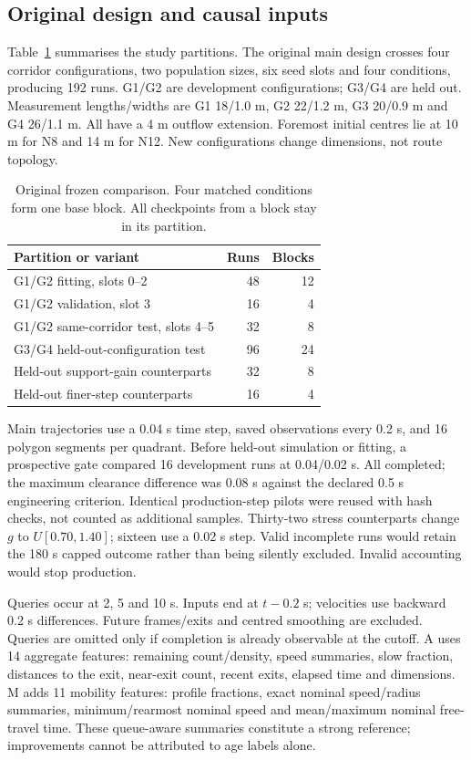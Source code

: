 \subsection{Original design and causal inputs}
Table~\ref{tab:design} summarises the study partitions. The original main design crosses four corridor configurations, two population sizes, six seed slots and four conditions, producing 192 runs. G1/G2 are development configurations; G3/G4 are held out. Measurement lengths/widths are G1 18/1.0 m, G2 22/1.2 m, G3 20/0.9 m and G4 26/1.1 m. All have a 4 m outflow extension. Foremost initial centres lie at 10 m for N8 and 14 m for N12. New configurations change dimensions, not route topology.

\begin{table}[!t]\centering\small
\caption{Original frozen comparison. Four matched conditions form one base block. All checkpoints from a block stay in its partition.}
\label{tab:design}
\begin{tabular}{lrr}\toprule Partition or variant & Runs & Blocks\\\midrule
G1/G2 fitting, slots 0--2 & 48 & 12\\
G1/G2 validation, slot 3 & 16 & 4\\
G1/G2 same-corridor test, slots 4--5 & 32 & 8\\
G3/G4 held-out-configuration test & 96 & 24\\
Held-out support-gain counterparts & 32 & 8\\
Held-out finer-step counterparts & 16 & 4\\\bottomrule
\end{tabular}
\end{table}

Main trajectories use a 0.04 s time step, saved observations every 0.2 s, and 16 polygon segments per quadrant. Before held-out simulation or fitting, a prospective gate compared 16 development runs at 0.04/0.02 s. All completed; the maximum clearance difference was 0.08 s against the declared 0.5 s engineering criterion. Identical production-step pilots were reused with hash checks, not counted as additional samples. Thirty-two stress counterparts change $g$ to $U[0.70,1.40]$; sixteen use a 0.02 s step. Valid incomplete runs would retain the 180 s capped outcome rather than being silently excluded. Invalid accounting would stop production.

Queries occur at 2, 5 and 10 s. Inputs end at $t-0.2$ s; velocities use backward 0.2 s differences. Future frames/exits and centred smoothing are excluded. Queries are omitted only if completion is already observable at the cutoff. A uses 14 aggregate features: remaining count/density, speed summaries, slow fraction, distances to the exit, near-exit count, recent exits, elapsed time and dimensions. M adds 11 mobility features: profile fractions, exact nominal speed/radius summaries, minimum/rearmost nominal speed and mean/maximum nominal free-travel time. These queue-aware summaries constitute a strong reference; improvements cannot be attributed to age labels alone.

